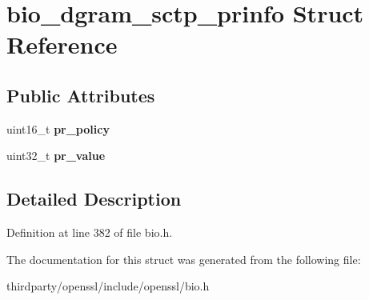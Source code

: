 \hypertarget{structbio__dgram__sctp__prinfo}{}\section{bio\+\_\+dgram\+\_\+sctp\+\_\+prinfo Struct Reference}
\label{structbio__dgram__sctp__prinfo}
\subsection*{Public Attributes}
\begin{DoxyCompactItemize}
\item 
\mbox{\label{structbio__dgram__sctp__prinfo_a758b4f0c23b00677d3e0f8b08b5166a8}} 
uint16\+\_\+t {\bfseries pr\+\_\+policy}
\item 
\mbox{\label{structbio__dgram__sctp__prinfo_aaef676fc35f418527ebfde25c1fc047e}} 
uint32\+\_\+t {\bfseries pr\+\_\+value}
\end{DoxyCompactItemize}


\subsection{Detailed Description}


Definition at line 382 of file bio.\+h.



The documentation for this struct was generated from the following file\+:\begin{DoxyCompactItemize}
\item 
thirdparty/openssl/include/openssl/bio.\+h\end{DoxyCompactItemize}
